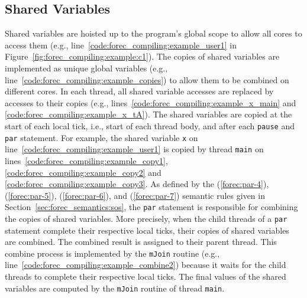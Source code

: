\subsection{Shared Variables}
Shared variables are hoisted up to the program's global 
scope to allow all cores to access them (e.g., 
line~\ref{code:forec_compiling:example_user1} in 
Figure~\ref{fig:forec_compiling:example:c1}). The copies of 
shared variables are implemented as unique global variables 
(e.g., line~\ref{code:forec_compiling:example_copies}) to
allow them to be combined on different cores. In each 
thread, all shared variable 
accesses are replaced by accesses to their copies
(e.g., lines~\ref{code:forec_compiling:example_x_main} and 
\ref{code:forec_compiling:example_x_tA}). 
The shared variables are copied at the start of each 
local tick, i.e., start of each 
thread body, and after each \verb$pause$ 
and \verb$par$ statement. For example, the shared variable
\verb$x$ on line~\ref{code:forec_compiling:example_user1}
is copied by thread \verb$main$ on 
lines~\ref{code:forec_compiling:example_copy1}, 
\ref{code:forec_compiling:example_copy2} and 
\ref{code:forec_compiling:example_copy3}.
As defined by the (\ref{forec:par-4}), (\ref{forec:par-5}), 
(\ref{forec:par-6}), and (\ref{forec:par-7}) semantic rules 
given in Section~\ref{sec:forec_semantics:sos}, 
the \verb$par$ statement is responsible for combining the copies
of shared variables. More precisely, when the child threads
of a \verb$par$ statement complete their respective local ticks,
their copies of shared variables are combined. The combined
result is assigned to their parent thread. This combine process
is implemented by the \verb$mJoin$ routine (e.g., 
line~\ref{code:forec_compiling:example_combine2}) because it 
waits for the child threads to complete their respective local 
ticks. The final values of the shared variables are computed 
by the \verb$mJoin$ routine of thread \verb$main$.


